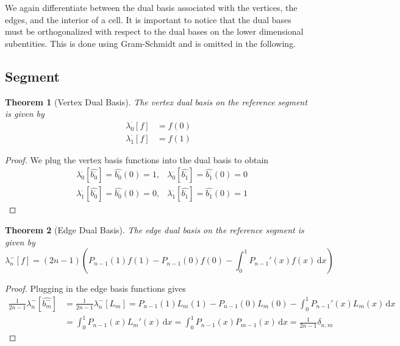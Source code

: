 \documentclass[10pt,a4paper]{article}
\newtheorem{thm}{Theorem}
\begin{document}
    We again differentiate between the dual basis associated with the vertices, the edges, and the interior of a cell. It is important to notice that the dual bases must be orthogonalized with respect to the dual bases on the lower dimensional subentities. This is done using Gram-Schmidt and is omitted in the following.


\subsection{Segment}

    \begin{thm}[Vertex Dual Basis]
        The vertex dual basis on the reference segment is given by
        \begin{align*}
            \lambda_0^{\cdot}[f] &= f(0) \\
            \lambda_1^{\cdot}[f] &= f(1)
        \end{align*}
    \end{thm}
    \begin{proof}
        We plug the vertex basis functions into the dual basis to obtain
        \begin{align*}
            &\lambda_0^{\cdot}[\widehat{b_0^{\cdot}}] = \widehat{b_0^{\cdot}}(0) = 1, &\lambda_0^{\cdot}[\widehat{b_1^{\cdot}}] = \widehat{b_1^{\cdot}}(0) = 0 \\
            &\lambda_1^{\cdot}[\widehat{b_0^{\cdot}}] = \widehat{b_0^{\cdot}}(0) = 0, &\lambda_1^{\cdot}[\widehat{b_1^{\cdot}}] = \widehat{b_1^{\cdot}}(0) = 1
        \end{align*}
    \end{proof}

    \begin{thm}[Edge Dual Basis]
        The edge dual basis on the reference segment is given by
        \begin{equation*}
            \lambda_n^{-}[f] = (2n-1) \left( P_{n-1}(1)f(1) - P_{n-1}(0)f(0) - \int_0^1\! P_{n-1}'(x)f(x) \,\mathrm{d}x \right)
        \end{equation*}
    \end{thm}
    \begin{proof}
        Plugging in the edge basis functions gives
        \begin{align*}
            \frac{1}{2n-1}\lambda_n^{-}[\widehat{b_m^{-}}] &= \frac{1}{2n-1}\lambda_n^{-}[L_m] = P_{n-1}(1)L_m(1) - P_{n-1}(0)L_m(0) - \int_0^1\! P_{n-1}'(x)L_m(x) \,\mathrm{d}x \\
            &= \int_0^1\! P_{n-1}(x)L_m'(x) \,\mathrm{d}x = \int_0^1\! P_{n-1}(x)P_{m-1}(x) \,\mathrm{d}x = \frac{1}{2n-1}\delta_{n,m}
        \end{align*}
    \end{proof}
\end{document}
